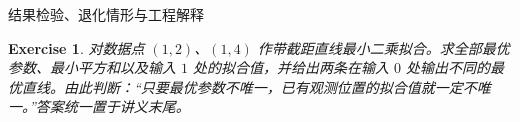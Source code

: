 \documentclass[aspectratio=169,10pt,fontset=fandol]{ctexbeamer}
\newtheorem{exercise}{Exercise}
\begin{document}
\begin{frame}[t,fragile]{结果检验、退化情形与工程解释}
\normalsize
{\normalsize
\begin{exercise}
\label{mathagent:exercise:2a86525c0362bd6004ffb20b570bb82a80598d07bb305d4bd130c7cd7cc87533}
对数据点 $(1,2)$、$(1,4)$ 作带截距直线最小二乘拟合。求全部最优参数、最小平方和以及输入 $1$ 处的拟合值，并给出两条在输入 $0$ 处输出不同的最优直线。由此判断：“只要最优参数不唯一，已有观测位置的拟合值就一定不唯一。”答案统一置于讲义末尾。
\end{exercise}
}
\end{frame}
\end{document}
